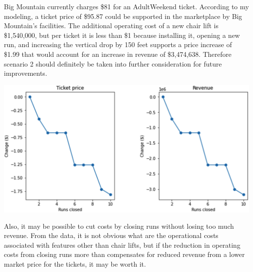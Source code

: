 \documentclass[11pt]{article}
\begin{document}
Big Mountain currently charges \$81 for an AdultWeekend ticket. According to my modeling, a ticket price of \$95.87 could be supported in the marketplace
by Big Mountain's facilities. The additional operating cost of a new chair lift
is \$1,540,000, but per ticket it is less than \$1 because installing it,
opening a new run, and increasing the vertical drop by 150 feet supports
a price increase of \$1.99 that would account for an increase in revenue
of \$3,474,638. Therefore scenario 2 should definitely be taken into further
consideration for future improvements.
\begin{center}
\includegraphics[scale=.25]{effectofclosingrunsonmarketpriceandrevenue}
\end{center}
Also, it may be possible to cut costs by closing runs without losing too
much revenue. From the data, it is not obvious what are the operational
costs associated with features other than chair lifts, but if the reduction
in operating costs from closing runs more than compensates for reduced
revenue from a lower market price for the tickets, it may be worth it.
\end{document}
